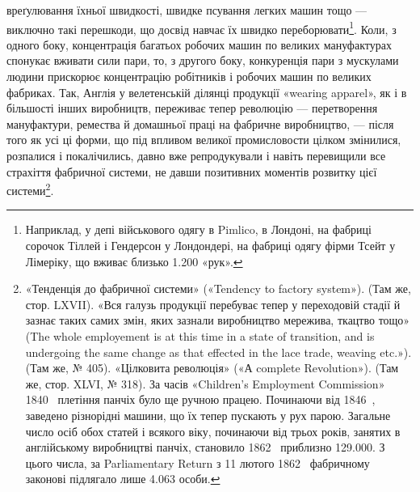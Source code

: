 \parcont{}  %
вреґулювання їхньої швидкості, швидке псування легких машин
тощо — виключно такі перешкоди, що досвід навчає їх швидко
переборювати\footnote{
Наприклад, у депі військового одягу в Pimlico, в Лондоні, на
фабриці сорочок Тіллей і Гендерсон у Лондондері, на фабриці одягу фірми
Тсейт у Лімеріку, що вживає близько \num{1.200} «рук».
}. Коли, з одного боку, концентрація багатьох
робочих машин по великих мануфактурах спонукає вживати сили
пари, то, з другого боку, конкуренція пари з мускулами людини
прискорює концентрацію робітників і робочих машин по великих
фабриках. Так, Англія у велетенській ділянці продукції «wearing
apparel», як і в більшості інших виробництв, переживає тепер
революцію — перетворення мануфактури, ремества й домашньої
праці на фабричне виробництво, — після того як усі ці форми,
що під впливом великої промисловости цілком змінилися,
розпалися і покалічились, давно вже репродукували і навіть
перевищили все страхіття фабричної системи, не давши позитивних
моментів розвитку цієї системи\footnote{
«Тенденція до фабричної системи» («Tendency to factory system»).
(Там же, стор. LXVII). «Вся галузь продукції перебуває тепер у переходовій
стадії й зазнає таких самих змін, яких зазнали виробництво мережива,
ткацтво тощо» (The whole employement is at this time in a state
of transition, and is undergoing the same change as that effected in the
lace trade, weaving etc.»). (Там же, № 405). «Цілковита революція» («А
complete Revolution»). (Там же, стор. XLVI, № 318). За часів «Children’s
Employment Commission» 1840~ плетіння панчіх було ще ручною
працею. Починаючи від 1846~, заведено різнорідні машини, що їх тепер
пускають у рух парою. Загальне число осіб обох статей і всякого
віку, починаючи від трьох років, занятих в англійському виробництві
панчіх, становило 1862~ приблизно \num{129.000}. З цього числа, за Parliamentary
Return з 11 лютого 1862~ фабричному законові підлягало
лише \num{4.063} особи.
}.

